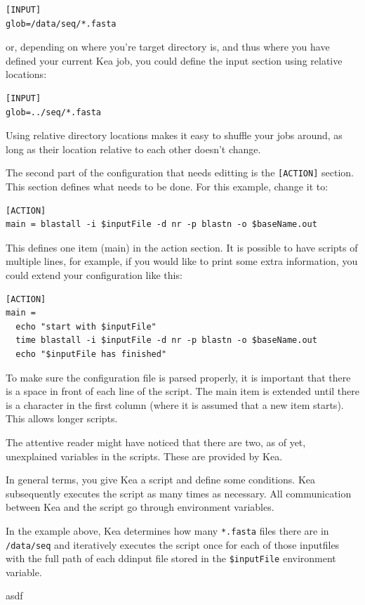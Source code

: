 \begin{lstlisting}
[INPUT]
glob=/data/seq/*.fasta
\end{lstlisting}

or, depending on where you're target directory is, and thus where you
have defined your current Kea job, you could define the input section
using relative locations:

\begin{lstlisting}
[INPUT]
glob=../seq/*.fasta
\end{lstlisting}

Using relative directory locations makes it easy to shuffle your jobs
around, as long as their location relative to each other doesn't change.

The second part of the configuration that needs editting is the
\lstinline![ACTION]! section. This section defines what needs to be
done. For this example, change it to:

\begin{lstlisting}
[ACTION]
main = blastall -i $inputFile -d nr -p blastn -o $baseName.out
\end{lstlisting}

This defines one item (main) in the action section. It is possible to
have scripts of multiple lines, for example, if you would like to
print some extra information, you could extend your configuration like
this:

\begin{lstlisting}
[ACTION]
main =
  echo "start with $inputFile"  
  time blastall -i $inputFile -d nr -p blastn -o $baseName.out
  echo "$inputFile has finished"
\end{lstlisting}

To make sure the configuration file is parsed properly, it is
important that there is a space in front of each line of the
script. The main item is extended until there is a character in the
first column (where it is assumed that a new item starts). This allows
longer scripts.

The attentive reader might have noticed that there are two, as of yet,
unexplained variables in the scripts. These are provided by Kea.

In general terms, you give Kea a script and define some
conditions. Kea subsequently executes the script as many times as
necessary. All communication between Kea and the script go through
environment variables.

In the example above, Kea determines how many \lstinline{*.fasta}
files there are in \lstinline{/data/seq} and iteratively executes the
script once for each of those inputfiles with the full path of each
ddinput file stored in the \lstinline{$inputFile} environment variable. 

asdf

